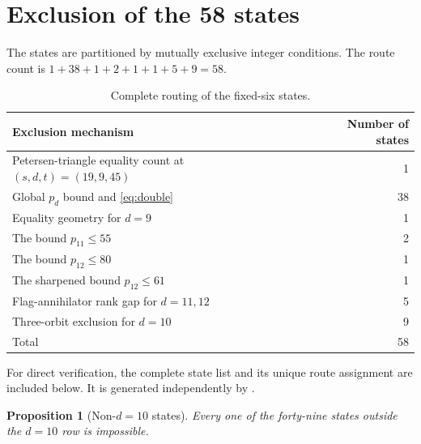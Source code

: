 \documentclass[11pt,reqno]{amsart}
\newtheorem{proposition}[theorem]{Proposition}
\theoremstyle{definition}
\begin{document}
\section{Exclusion of the 58 states}\label{sec:endpoints}

The states are partitioned by mutually exclusive integer conditions. The
route count is \(1+38+1+2+1+1+5+9=58\).
\begin{table}[ht]
\centering
\caption{Complete routing of the fixed-six states.}\label{tab:routes}
\begin{tabular}{@{}lr@{}}
\toprule
Exclusion mechanism & Number of states\\ \midrule
Petersen-triangle equality count at \((s,d,t)=(19,9,45)\) &1\\
Global \(p_d\) bound and \eqref{eq:double} &38\\
Equality geometry for \(d=9\) &1\\
The bound \(p_{11}\le55\) &2\\
The bound \(p_{12}\le80\) &1\\
The sharpened bound \(p_{12}\le61\) &1\\
Flag-annihilator rank gap for \(d=11,12\) &5\\
Three-orbit exclusion for \(d=10\) &9\\ \midrule
Total &58\\ \bottomrule
\end{tabular}
\end{table}

For direct verification, the complete state list and its unique route assignment are
included below. It is generated independently by
.


\begin{proposition}[Non-\(d=10\) states]\label{prop:nondten}
Every one of the forty-nine states outside the \(d=10\) row is impossible.
\end{proposition}
\end{document}
